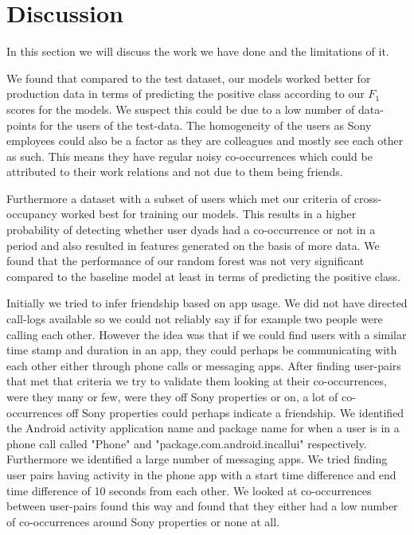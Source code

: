 \chapter{Discussion}
\label{chap:discussion}
In this section we will discuss the work we have done and the limitations of it.

We found that compared to the test dataset, our models worked better for production data in terms of predicting the positive class according to our $F_1$ scores for the models. We suspect this could be due to a low number of data-points for the users of the test-data. The homogeneity of the users as Sony employees could also be a factor as they are colleagues and mostly see each other as such. This means they have regular noisy co-occurrences which could be attributed to their work relations and not due to them being friends.

Furthermore a dataset with a subset of users which met our criteria of cross-occupancy worked best for training our models. This results in a higher probability of detecting whether user dyads had a co-occurrence or not in a period and also resulted in features generated on the basis of more data. We found that the performance of our random forest was not very significant compared to the baseline model at least in terms of predicting the positive class.

Initially we tried to infer friendship based on app usage. We did not have directed call-logs available so we could not reliably say if for example two people were calling each other. However the idea was that if we could find users with a similar time stamp and duration in an app, they could perhaps be communicating with each other either through phone calls or messaging apps. After finding user-pairs that met that criteria we try to validate them looking at their co-occurrences, were they many or few, were they off Sony properties or on, a lot of co-occurrences off Sony properties could perhaps indicate a friendship. We identified the Android activity application name and package name for when a user is in a phone call called "Phone" and "package.com.android.incallui" respectively. Furthermore we identified a large number of messaging apps. We tried finding user pairs having activity in the phone app with a start time difference and end time difference of 10 seconds from each other. We looked at co-occurrences between user-pairs found this way and found that they either had a low number of co-occurrences around Sony properties or none at all.

